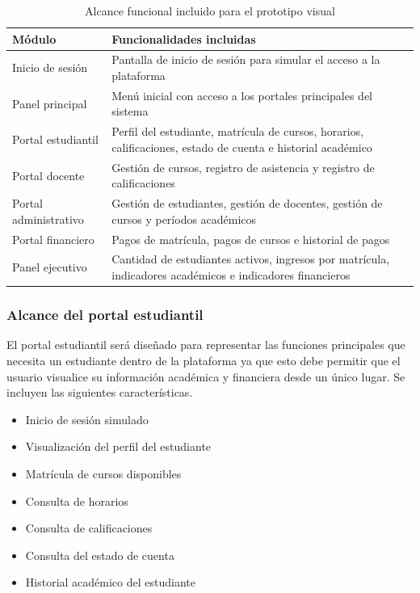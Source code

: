 \documentclass[11pt,spanish]{article}
\begin{document}
\begin{table}[H]
\centering
\caption{Alcance funcional incluido para el prototipo visual}
\label{tab:modulos-incluidos}
{\small
\begin{tabularx}{\textwidth}{L{4cm} Y}
\toprule
\textbf{Módulo} & \textbf{Funcionalidades incluidas} \\
\midrule
Inicio de sesión & Pantalla de inicio de sesión para simular el acceso a la plataforma \\
Panel principal & Menú inicial con acceso a los portales principales del sistema \\
Portal estudiantil & Perfil del estudiante, matrícula de cursos, horarios, calificaciones, estado de cuenta e historial académico \\
Portal docente & Gestión de cursos, registro de asistencia y registro de calificaciones \\
Portal administrativo & Gestión de estudiantes, gestión de docentes, gestión de cursos y períodos académicos \\
Portal financiero & Pagos de matrícula, pagos de cursos e historial de pagos \\
Panel ejecutivo & Cantidad de estudiantes activos, ingresos por matrícula, indicadores académicos e indicadores financieros \\
\bottomrule
\end{tabularx}
}
\end{table}

\subsubsection{Alcance del portal estudiantil}

El portal estudiantil será diseñado para representar las funciones principales que necesita un estudiante dentro de la plataforma ya que esto debe permitir que el usuario visualice su información académica y financiera desde un único lugar. Se incluyen las siguientes características.

\begin{itemize}
    \item Inicio de sesión simulado
    \item Visualización del perfil del estudiante
    \item Matrícula de cursos disponibles
    \item Consulta de horarios
    \item Consulta de calificaciones
    \item Consulta del estado de cuenta
    \item Historial académico del estudiante
\end{itemize}
\end{document}
